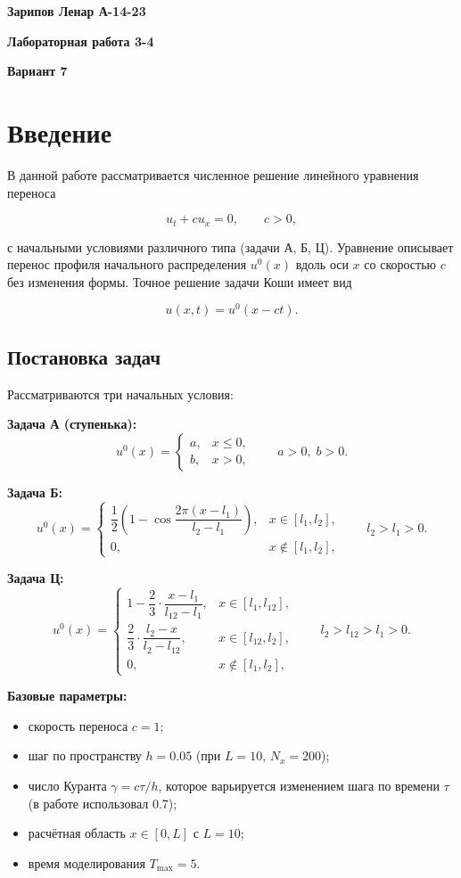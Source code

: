\documentclass[12pt]{article}
\begin{document}
\centerline{\bf Зарипов Ленар А-14-23}
\centerline{\bf Лабораторная работа 3-4}
\centerline{\bf Вариант 7}

\medskip
\section*{Введение}

В данной работе рассматривается численное решение линейного уравнения переноса

\[
u_t + c u_x = 0, \qquad c > 0,
\]

с начальными условиями различного типа (задачи А, Б, Ц). Уравнение описывает перенос профиля начального распределения $u^0(x)$ вдоль оси $x$ со скоростью $c$ без изменения формы. Точное решение задачи Коши имеет вид

\[
u(x,t) = u^0(x - ct).
\]

\subsection*{Постановка задач}

Рассматриваются три начальных условия:

\textbf{Задача А (ступенька):}
\[
u^0(x) = \begin{cases} 
a, & x \le 0, \\
b, & x > 0,
\end{cases} \qquad a > 0,\; b > 0.
\]

\textbf{Задача Б:}
\[
u^0(x) = \begin{cases}
\dfrac12\left(1 - \cos\dfrac{2\pi(x-l_1)}{l_2 - l_1}\right), & x \in [l_1, l_2], \\[8pt]
0, & x \notin [l_1, l_2],
\end{cases} \qquad l_2 > l_1 > 0.
\]

\textbf{Задача Ц:}
\[
u^0(x) = \begin{cases}
1 - \dfrac23\cdot\dfrac{x - l_1}{l_{12} - l_1}, & x \in [l_1, l_{12}], \\[10pt]
\dfrac23\cdot\dfrac{l_2 - x}{l_2 - l_{12}}, & x \in [l_{12}, l_2], \\[6pt]
0, & x \notin [l_1, l_2],
\end{cases} \qquad l_2 > l_{12} > l_1 > 0.
\]

\medskip

\textbf{Базовые параметры:}
\begin{itemize}
\item скорость переноса $c = 1$;
\item шаг по пространству $h = 0.05$ (при $L = 10$, $N_x = 200$);
\item число Куранта $\gamma = c\tau/h$, которое варьируется изменением шага по времени $\tau$ (в работе использовал 0.7);
\item расчётная область $x \in [0, L]$ с $L = 10$;
\item время моделирования $T_{\max} = 5$.
\end{itemize}
\end{document}
